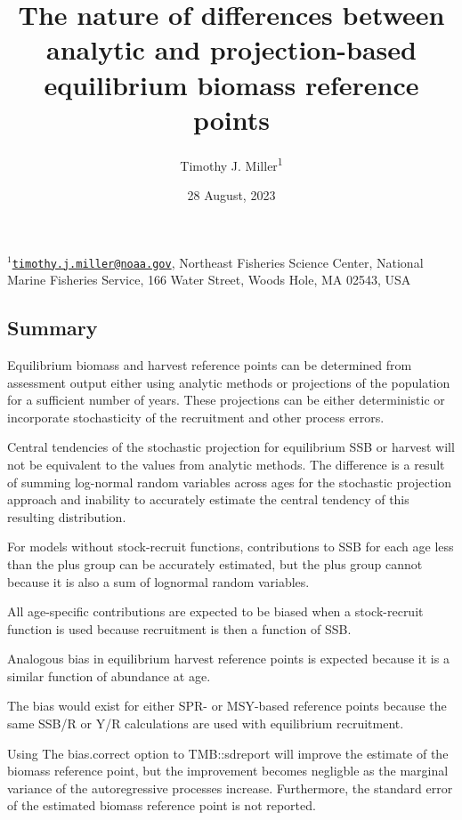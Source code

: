 \documentclass[
]{article}
\title{The nature of differences between analytic and projection-based equilibrium biomass reference points}
\author{Timothy J. Miller\textsuperscript{1}}
\date{28 August, 2023}
\begin{document}
\maketitle

\(^1\)\href{mailto:timothy.j.miller@noaa.gov}{\nolinkurl{timothy.j.miller@noaa.gov}}, Northeast Fisheries Science Center, National Marine Fisheries Service, 166 Water Street, Woods Hole, MA 02543, USA\\

\pagebreak

\hypertarget{summary}{%
\subsection*{Summary}\label{summary}}

Equilibrium biomass and harvest reference points can be determined from assessment output either using analytic methods or projections of the population for a sufficient number of years. These projections can be either deterministic or incorporate stochasticity of the recruitment and other process errors.

Central tendencies of the stochastic projection for equilibrium SSB or harvest will not be equivalent to the values from analytic methods. The difference is a result of summing log-normal random variables across ages for the stochastic projection approach and inability to accurately estimate the central tendency of this resulting distribution.

For models without stock-recruit functions, contributions to SSB for each age less than the plus group can be accurately estimated, but the plus group cannot because it is also a sum of lognormal random variables.

All age-specific contributions are expected to be biased when a stock-recruit function is used because recruitment is then a function of SSB.

Analogous bias in equilibrium harvest reference points is expected because it is a similar function of abundance at age.

The bias would exist for either SPR- or MSY-based reference points because the same SSB/R or Y/R calculations are used with equilibrium recruitment.

Using The bias.correct option to TMB::sdreport will improve the estimate of the biomass reference point, but the improvement becomes negligble as the marginal variance of the autoregressive processes increase. Furthermore, the standard error of the estimated biomass reference point is not reported.
\end{document}
